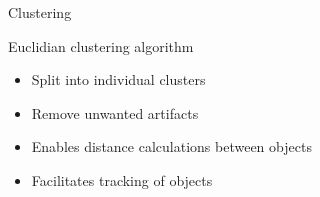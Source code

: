 
\begin{frame}{Clustering}
	
	Euclidian clustering algorithm
	\begin{itemize}
	\item Split into individual clusters
	\item Remove unwanted artifacts
	\item Enables distance calculations between objects
	\item Facilitates tracking of objects 
	\end{itemize}
	
	\end{frame}
	\begin{frame}
	\begin{algorithm}[H]
 \SetAlgoLined %
 \caption{Clustering Algorithm}
\end{algorithm}
\end{frame}
